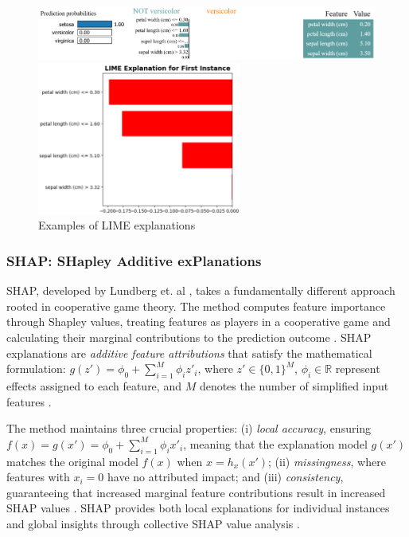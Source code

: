 \begin{figure}[htbp]
    \centering
    \includegraphics[width=1\textwidth]{images/limeexplain1.png}
    
    \vspace{0.5cm} 
    
    \includegraphics[width=0.6\textwidth]{images/limeexplain2.png}
    \caption{Examples of LIME explanations}
    \label{fig:LimeExpExamp}
\end{figure}

\subsubsection{SHAP: SHapley Additive exPlanations}

SHAP, developed by Lundberg et. al \cite{lundberg2017unified}, takes a fundamentally different approach rooted in cooperative game theory. The method computes feature importance through Shapley values, treating features as players in a cooperative game and calculating their marginal contributions to the prediction outcome \cite{alicioglu2021survey}. SHAP explanations are \textit{additive feature attributions} that satisfy the mathematical formulation: $g(z') = \phi_0 + \sum_{i=1}^{M} \phi_i z'_i$, where $z' \in \{0,1\}^M$, $\phi_i \in \mathbb{R}$ represent effects assigned to each feature, and $M$ denotes the number of simplified input features \cite{lundberg2017unified, bodria2023benchmarking}.

The method maintains three crucial properties: (i) \textit{local accuracy}, ensuring $f(x) = g(x') = \phi_0 + \sum^M_{i=1}\phi_ix'_i$, meaning that the explanation model $g(x')$ matches the original model $f(x)$ when $x=h_x(x')$; (ii) \textit{missingness}, where features with $x_i = 0$ have no attributed impact; and (iii) \textit{consistency}, guaranteeing that increased marginal feature contributions result in increased SHAP values \cite{lundberg2017unified, bodria2023benchmarking}. SHAP provides both local explanations for individual instances and global insights through collective SHAP value analysis \cite{bodria2023benchmarking}.


